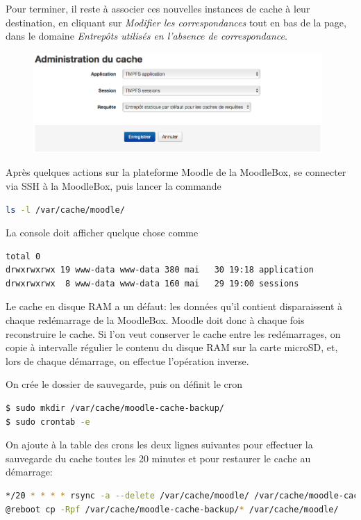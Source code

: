 \documentclass[11pt]{article}
\begin{document}
Pour terminer, il reste à associer ces nouvelles instances de cache à leur destination, en cliquant sur \emph{Modifier les correspondances} tout en bas de la page, dans le domaine \emph{Entrepôts utilisés en l'absence de correspondance}.

\begin{figure}[!ht]
\begin{minipage}[b]{\linewidth}
\centering
\includegraphics[width=11cm]{cache-association.png}
\end{minipage}
\end{figure}

\begin{verification}
Après quelques actions sur la plateforme Moodle de la MoodleBox, se connecter via SSH à la MoodleBox, puis lancer la commande 
\begin{lstlisting}[language=bash]
ls -l /var/cache/moodle/
\end{lstlisting}
La console doit afficher quelque chose comme
\begin{lstlisting}[language=bash]
total 0
drwxrwxrwx 19 www-data www-data 380 mai   30 19:18 application
drwxrwxrwx  8 www-data www-data 160 mai   29 19:00 sessions
\end{lstlisting}
\end{verification}

Le cache en disque RAM a un défaut: les données qu'il contient disparaissent à chaque redémarrage de la MoodleBox. Moodle doit donc à chaque fois reconstruire le cache. Si l'on veut conserver le cache entre les redémarrages, on copie à intervalle régulier le contenu du disque RAM sur la carte microSD, et, lors de chaque démarrage, on effectue l'opération inverse.

On crée le dossier de sauvegarde, puis on définit le cron
\begin{lstlisting}[language=bash]
$ sudo mkdir /var/cache/moodle-cache-backup/
$ sudo crontab -e
\end{lstlisting}

On ajoute à la table des crons les deux lignes suivantes pour effectuer la sauvegarde du cache toutes les 20 minutes et pour restaurer le cache au démarrage:
\begin{lstlisting}[language=bash]
*/20 * * * * rsync -a --delete /var/cache/moodle/ /var/cache/moodle-cache-backup/
@reboot cp -Rpf /var/cache/moodle-cache-backup/* /var/cache/moodle/
\end{lstlisting}
\end{document}
